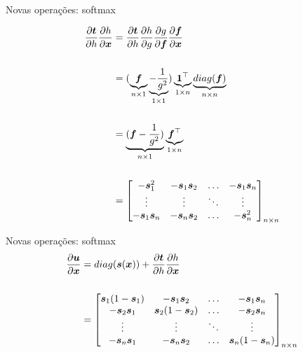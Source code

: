 \documentclass[10pt]{beamer}
\begin{document}
\begin{frame}{Novas operações: softmax}

\begin{align*}
\frac{\partial \bm{t}}{\partial h}\frac{\partial h}{\partial \bm{x}} & = \frac{\partial \bm{t}}{\partial h}\frac{\partial h}{\partial g}\frac{\partial g}{\partial \bm{f}}\frac{\partial \bm{f}}{\partial \bm{x}}\\
&\\
&= (\underbrace{\bm{f}}_{\tiny{n \times 1}} \underbrace{-\frac{1}{g^{2}}}_{\tiny{1 \times 1}}) \underbrace{\bm{1}^{\top}}_{\tiny{1 \times n}} \underbrace{diag(\bm{f})}_{\tiny{n \times n}}\\
&\\
&= \underbrace{(\bm{f} -\frac{1}{g^{2}})}_{\tiny{n \times 1}} \underbrace{\bm{f}^{\top}}_{\tiny{1 \times n}} \\
&\\
&= \begin{bmatrix} -\bm{s}_{1}^{2} & -\bm{s}_1\bm{s}_2 & \dots & -\bm{s}_1\bm{s}_n\\\vdots & \vdots & \ddots & \vdots\\ -\bm{s}_1\bm{s}_n & -\bm{s}_n\bm{s}_2 & \dots & -\bm{s}_{n}^{2}\end{bmatrix}_{\tiny{n \times n}}\\
\end{align*}

\end{frame}


\begin{frame}{Novas operações: softmax}
\large{
\begin{align*}
\frac{\partial \bm{u}}{\partial \bm{x}} &= diag(\bm{s}(\bm{x}))  + \frac{\partial \bm{t}}{\partial h}\frac{\partial h}{\partial \bm{x}}\\
&\\
&= \begin{bmatrix} \bm{s}_{1}(1 - \bm{s}_{1}) & -\bm{s}_1\bm{s}_2 & \dots & -\bm{s}_1\bm{s}_n\\
-\bm{s}_2\bm{s}_1 & \bm{s}_{2}(1 - \bm{s}_{2}) & \dots & -\bm{s}_2\bm{s}_n\\
\vdots & \vdots & \ddots & \vdots\\ 
-\bm{s}_n\bm{s}_1 & -\bm{s}_n\bm{s}_2 & \dots & \bm{s}_{n}(1 - \bm{s}_{n})\end{bmatrix}_{\tiny{n \times n}}\\
\end{align*}
}
\end{frame}
\end{document}

